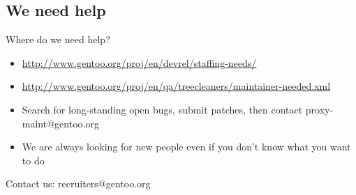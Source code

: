 \subsection{We need help}
\begin{frame}{Where do we need help?}
	\begin{itemize}
		\item \href{http://www.gentoo.org/proj/en/devrel/staffing-needs/}{http://www.gentoo.org/proj/en/devrel/staffing-needs/}
		\item \href{http://www.gentoo.org/proj/en/qa/treecleaners/maintainer-needed.xml}{http://www.gentoo.org/proj/en/qa/treecleaners/maintainer-needed.xml}
		\item Search for long-standing open bugs, submit patches, then contact proxy-maint@gentoo.org
		\item We are always looking for new people even if you don't know what you want to do
	\end{itemize}
\begin{center}Contact us: recruiters@gentoo.org\end{center}
\end{frame}
